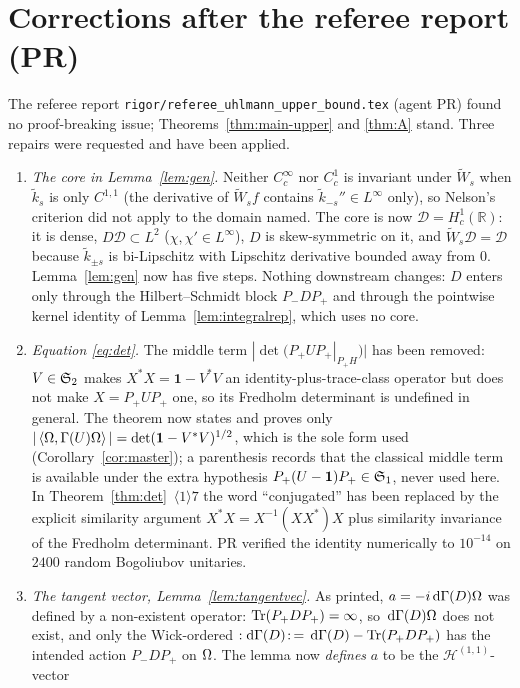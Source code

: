 \documentclass[11pt]{article}
\newcommand{\Pp}{P_+}\newcommand{\Pm}{P_-}
\newcommand{\Wt}{\widetilde W}\newcommand{\kt}{\widetilde k}
\newcommand{\Gm}{\Gamma}
\newcommand{\ip}[2]{\left\langle #1,#2\right\rangle}\newcommand{\one}{\mathbf 1}
\begin{document}
\section{Corrections after the referee report (PR)}\label{sec:corrections}
The referee report \texttt{rigor/referee\_uhlmann\_upper\_bound.tex} (agent PR) found no
proof-breaking issue; Theorems~\ref{thm:main-upper} and \ref{thm:A} stand.  Three repairs were
requested and have been applied.
\begin{enumerate}[label=(R\arabic*),leftmargin=3em]
\item \emph{The core in Lemma~\ref{lem:gen}.}  Neither $C_c^\infty$ nor $C_c^1$ is invariant under
 $\Wt_s$ when $\kt_s$ is only $C^{1,1}$ (the derivative of $\Wt_sf$ contains $\kt_{-s}''\in
 L^\infty$ only), so Nelson's criterion did not apply to the domain named.  The core is now
 $\mathcal D=H^1_c(\mathbb R)$: it is dense, $D\mathcal D\subset L^2$ ($\chi,\chi'\in L^\infty$),
 $D$ is skew-symmetric on it, and $\Wt_s\mathcal D=\mathcal D$ because $\kt_{\pm s}$ is bi-Lipschitz
 with Lipschitz derivative bounded away from $0$.  Lemma~\ref{lem:gen} now has five steps.  Nothing
 downstream changes: $D$ enters only through the Hilbert--Schmidt block $\Pm D\Pp$ and through the
 pointwise kernel identity of Lemma~\ref{lem:integralrep}, which uses no core.
\item \emph{Equation \eqref{eq:det}.}  The middle term $|\det(\Pp U\Pp|_{\Pp H})|$ has been removed:
 $V\in\mathfrak S_2$ makes $X^*X=\one-V^*V$ an identity-plus-trace-class operator but does not make
 $X=\Pp U\Pp$ one, so its Fredholm determinant is undefined in general.  The theorem now states and
 proves only $|\ip\Om{\Gm(U)\Om}|=\det(\one-V^*V)^{1/2}$, which is the sole form used
 (Corollary~\ref{cor:master}); a parenthesis records that the classical middle term is available
 under the extra hypothesis $\Pp(U-\one)\Pp\in\Sone$, never used here.  In
 Theorem~\ref{thm:det}~$\langle1\rangle7$ the word ``conjugated'' has been replaced by the explicit
 similarity argument $X^*X=X^{-1}(XX^*)X$ plus similarity invariance of the Fredholm determinant.
 PR verified the identity numerically to $10^{-14}$ on $2400$ random Bogoliubov unitaries.
\item \emph{The tangent vector, Lemma~\ref{lem:tangentvec}.}  As printed, $a=-i\dd\Gm(D)\Om$ was
 defined by a non-existent operator: $\Tr(\Pp D\Pp)=\infty$, so $\dd\Gm(D)\Om$ does not exist, and
 only the Wick-ordered $:\!\dd\Gm(D)\!:\,=\dd\Gm(D)-\Tr(\Pp D\Pp)$ has the intended action
 $\Pm D\Pp$ on $\Omega$.  The lemma now \emph{defines} $a$ to be the $\mathcal H^{(1,1)}$-vector

\end{enumerate}
\end{document}
